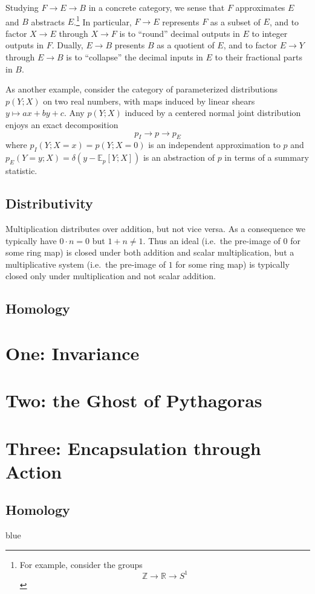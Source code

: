 \documentclass[11pt, justified]{tufte-book}
\newcommand{\EE}{\mathbb{E}}
\newcommand{\RR}{\mathbb{R}}
\newcommand{\ZZ}{\mathbb{Z}}
\theoremstyle{definition}
\newcommand{\msec}[1]{
    \chapter{\color{mblu}\textsf{#1}}
}
\newcommand{\mssec}[1]{\section{\color{mblu}\textsf{#1}}}
\begin{document}
        Studying $F\to E\to B$ in a concrete category, we sense that $F$
        approximates $E$ and $B$ abstracts $E$.\footnote{
            For example, consider the groups
            $$
                \ZZ \to \RR \to S^1
            $$
        } In particular, $F\to E$ represents
        $F$ as a subset of $E$, and to factor $X\to E$ through $X\to F$ is to
        ``round'' decimal outputs in $E$ to integer outputs in $F$.  Dually, $E\to
        B$ presents $B$ as a quotient of $E$, and to factor $E\to Y$ through
        $E\to B$ is to ``collapse'' the decimal inputs in $E$ to their
        fractional parts in $B$.

        As another example, consider the category of parameterized
        distributions $p(Y;X)$ on two real numbers, with maps induced by linear
        shears $y \mapsto ax + by + c$.  Any $p(Y;X)$ induced by a centered
        normal joint distribution enjoys an exact decomposition
        $$
            p_I \to p\to p_E
        $$
        where $p_I(Y;X=x) = p(Y;X=0)$ is an independent approximation to $p$
        and $p_E(Y=y;X) = \delta(y-\EE_p[Y;X])$ is an abstraction of $p$ in
        terms of a summary statistic.

        \mssec{Distributivity}

            Multiplication distributes over addition, but not vice versa.  As a
            consequence we typically have $0\cdot n = 0$ but $1 + n \neq 1$.
            Thus an ideal (i.e.\ the pre-image of $0$ for some ring map) is
            closed under both addition and scalar multiplication, but a
            multiplicative system (i.e.\ the pre-image of $1$ for some ring
            map) is typically closed only under multiplication and not scalar
            addition.

        \mssec{Homology}

    \msec{One: Invariance}
    \msec{Two: the Ghost of Pythagoras}
    \msec{Three: Encapsulation through Action}
        \mssec{Homology}
        blue
\end{document}
